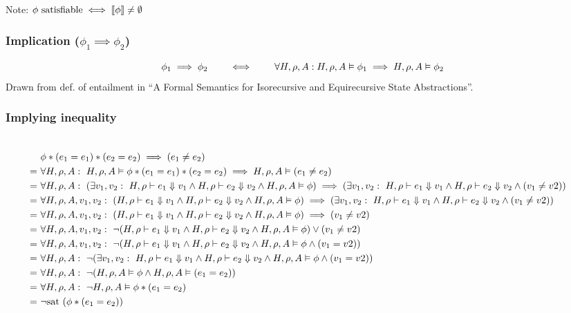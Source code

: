 \documentclass[11pt,a4paper]{article}
\begin{document}
Note: $\phi \text{ satisfiable} \iff \llbracket \phi \rrbracket \neq \emptyset$

\subsubsection{Implication ($\phi_1 \implies \phi_2$)}

\begin{equation*}
\phi_1 \implies \phi_2
\quad\quad \iff \quad\quad
\forall H, \rho, A: H,\rho,A \vDash \phi_1 \implies H,\rho,A \vDash \phi_2
\end{equation*}
Drawn from def. of entailment in ``A Formal Semantics for Isorecursive and Equirecursive State Abstractions''.

\subsubsection{Implying inequality}
\begin{align*}
\\   & \phi * (e_1 = e_1) * (e_2 = e_2) \implies (e_1 \neq e_2)
\\ =~& \forall H, \rho, A:~ H,\rho,A \vDash \phi * (e_1 = e_1) * (e_2 = e_2) \implies H,\rho,A \vDash (e_1 \neq e_2)
\\ =~& \forall H, \rho, A:~  (\exists v_1, v_2:~ H,\rho \vdash e_1 \Downarrow v_1 \wedge H,\rho \vdash e_2 \Downarrow v_2 \wedge H,\rho,A \vDash \phi) \implies (\exists v_1, v_2:~ H,\rho \vdash e_1 \Downarrow v_1 \wedge H,\rho \vdash e_2 \Downarrow v_2 \wedge (v_1 \neq v2))
\\ =~& \forall H, \rho, A, v_1, v_2:~  (H,\rho \vdash e_1 \Downarrow v_1 \wedge H,\rho \vdash e_2 \Downarrow v_2 \wedge H,\rho,A \vDash \phi) \implies (\exists v_1, v_2:~ H,\rho \vdash e_1 \Downarrow v_1 \wedge H,\rho \vdash e_2 \Downarrow v_2 \wedge (v_1 \neq v2))
\\ =~& \forall H, \rho, A, v_1, v_2:~  (H,\rho \vdash e_1 \Downarrow v_1 \wedge H,\rho \vdash e_2 \Downarrow v_2 \wedge H,\rho,A \vDash \phi) \implies (v_1 \neq v2)
\\ =~& \forall H, \rho, A, v_1, v_2:~  \neg (H,\rho \vdash e_1 \Downarrow v_1 \wedge H,\rho \vdash e_2 \Downarrow v_2 \wedge H,\rho,A \vDash \phi) \vee (v_1 \neq v2)
\\ =~& \forall H, \rho, A, v_1, v_2:~  \neg (H,\rho \vdash e_1 \Downarrow v_1 \wedge H,\rho \vdash e_2 \Downarrow v_2 \wedge H,\rho,A \vDash \phi \wedge (v_1 = v2))
\\ =~& \forall H, \rho, A:~ \neg (\exists v_1, v_2:~ H,\rho \vdash e_1 \Downarrow v_1 \wedge H,\rho \vdash e_2 \Downarrow v_2 \wedge H,\rho,A \vDash \phi \wedge (v_1 = v2))
\\ =~& \forall H, \rho, A:~ \neg (H,\rho,A \vDash \phi \wedge H,\rho,A \vDash (e_1 = e_2))
\\ =~& \forall H, \rho, A:~ \neg H,\rho,A \vDash \phi * (e_1 = e_2)
\\ =~& \neg \text{sat~}(\phi * (e_1 = e_2))
\end{align*}
\end{document}
